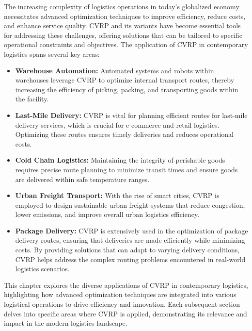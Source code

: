 \documentclass{article}
\begin{document}
    The increasing complexity of logistics operations in today's globalized economy necessitates advanced optimization techniques to improve efficiency, reduce costs, and enhance service quality. CVRP and its variants have become essential tools for addressing these challenges, offering solutions that can be tailored to specific operational constraints and objectives. The application of CVRP in contemporary logistics spans several key areas:

    \begin{itemize}
        \item \textbf{Warehouse Automation:} Automated systems and robots within warehouses leverage CVRP to optimize internal transport routes, thereby increasing the efficiency of picking, packing, and transporting goods within the facility. \cite{toth2014vehicle}
        \item \textbf{Last-Mile Delivery:} CVRP is vital for planning efficient routes for last-mile delivery services, which is crucial for e-commerce and retail logistics. Optimizing these routes ensures timely deliveries and reduces operational costs. \cite{toth2014vehicle}
        \item \textbf{Cold Chain Logistics:} Maintaining the integrity of perishable goods requires precise route planning to minimize transit times and ensure goods are delivered within safe temperature ranges. \cite{wang2017optimization}
        \item \textbf{Urban Freight Transport:} With the rise of smart cities, CVRP is employed to design sustainable urban freight systems that reduce congestion, lower emissions, and improve overall urban logistics efficiency. \cite{toth2014vehicle}
        \item \textbf{Package Delivery:} CVRP is extensively used in the optimization of package delivery routes, ensuring that deliveries are made efficiently while minimizing costs. By providing solutions that can adapt to varying delivery conditions, CVRP helps address the complex routing problems encountered in real-world logistics scenarios. \cite{toth2014vehicle}
    \end{itemize}

    This chapter explores the diverse applications of CVRP in contemporary logistics, highlighting how advanced optimization techniques are integrated into various logistical operations to drive efficiency and innovation. Each subsequent section delves into specific areas where CVRP is applied, demonstrating its relevance and impact in the modern logistics landscape.
\end{document}
